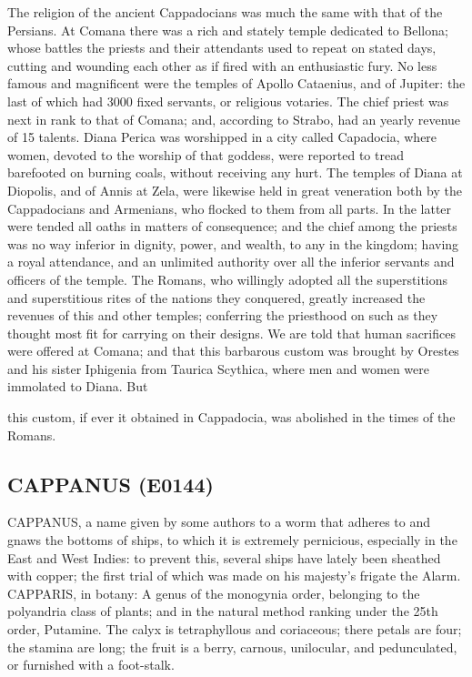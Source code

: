 \documentclass{article}
\begin{document}
The religion of the ancient Cappadocians was much the same with that of the Persians. At Comana there was a rich and stately temple dedicated to Bellona; whose battles the priests and their attendants used to repeat on stated days, cutting and wounding each other as if fired with an enthusiastic fury. No less famous and magnificent were the temples of Apollo Cataenius, and of Jupiter: the last of which had 3000 fixed servants, or religious votaries. The chief priest was next in rank to that of Comana; and, according to Strabo, had an yearly revenue of 15 talents. Diana Perica was worshipped in a city called Capadocia, where women, devoted to the worship of that goddess, were reported to tread barefooted on burning coals, without receiving any hurt. The temples of Diana at Diopolis, and of Annis at Zela, were likewise held in great veneration both by the Cappadocians and Armenians, who flocked to them from all parts. In the latter were tended all oaths in matters of consequence; and the chief among the priests was no way inferior in dignity, power, and wealth, to any in the kingdom; having a royal attendance, and an unlimited authority over all the inferior servants and officers of the temple. The Romans, who willingly adopted all the superstitions and superstitious rites of the nations they conquered, greatly increased the revenues of this and other temples; conferring the priesthood on such as they thought most fit for carrying on their designs. We are told that human sacrifices were offered at Comana; and that this barbarous custom was brought by Orestes and his sister Iphigenia from Taurica Scythica, where men and women were immolated to Diana. But

this custom, if ever it obtained in Cappadocia, was abolished in the times of the Romans.

\subsection*{CAPPANUS (E0144)}
CAPPANUS, a name given by some authors to a worm that adheres to and gnaws the bottoms of ships, to which it is extremely pernicious, especially in the East and West Indies: to prevent this, several ships have lately been sheathed with copper; the first trial of which was made on his majesty's frigate the Alarm. CAPPARIS, in botany: A genus of the monogynia order, belonging to the polyandria class of plants; and in the natural method ranking under the 25th order, Putamine. The calyx is tetraphyllous and coriaceous; there petals are four; the stamina are long; the fruit is a berry, carnous, unilocular, and pedunculated, or furnished with a foot-stalk.
\end{document}
